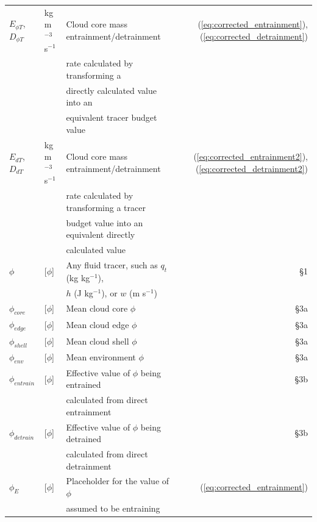 \documentclass[12pt]{article}
\begin{document}
\begin{appendix}
\begin{table}[t]
\begin{center}
\begin{tabular}{lllr}
 $E_{\phi T}$, $D_{\phi T}$
    & kg m$^{-3}$ s$^{-1}$ 
    & Cloud core mass entrainment/detrainment  
    &  (\ref{eq:corrected_entrainment}), (\ref{eq:corrected_detrainment}) \\
   && rate calculated by transforming a   & \\
   && directly calculated value into an  & \\
   && equivalent tracer budget value & \\
     
 $E_{d T}$, $D_{d T}$
    & kg m$^{-3}$ s$^{-1}$ 
    & Cloud core mass entrainment/detrainment 
    &  (\ref{eq:corrected_entrainment2}), (\ref{eq:corrected_detrainment2}) \\
   && rate calculated by transforming a tracer & \\
   && budget value into an equivalent directly  & \\
   && calculated value & \\

 $\phi$    
    & [$\phi$]            
    & Any fluid tracer, such as $q_t$ (kg kg$^{-1}$), 
    & \S 1 \\
   && $h$ (J kg$^{-1}$), or $w$ (m s$^{-1}$) & \\

 $\phi_{core}$    
    & [$\phi$]            
    & Mean cloud core $\phi$
    & \S 3a \\

 $\phi_{edge}$    
    & [$\phi$]            
    & Mean cloud edge $\phi$
    & \S 3a \\

 $\phi_{shell}$   
    & [$\phi$]            
    & Mean cloud shell $\phi$
    & \S 3a \\

 $\phi_{env}$     
    & [$\phi$]            
    & Mean environment $\phi$
    & \S 3a \\

 $\phi_{entrain}$ 
    & [$\phi$]            
    & Effective value of $\phi$ being entrained
    & \S 3b \\
   && calculated from direct entrainment& \\

 $\phi_{detrain}$ 
    & [$\phi$]            
    & Effective value of $\phi$ being detrained
    & \S 3b \\
   && calculated from direct detrainment & \\

 $\phi_E$         
    & [$\phi$]            
    & Placeholder for the value of $\phi$ 
    & (\ref{eq:corrected_entrainment}) \\
   && assumed to be entraining & \\


\end{tabular}
\end{center}
\end{table}
\end{appendix}
\end{document}
